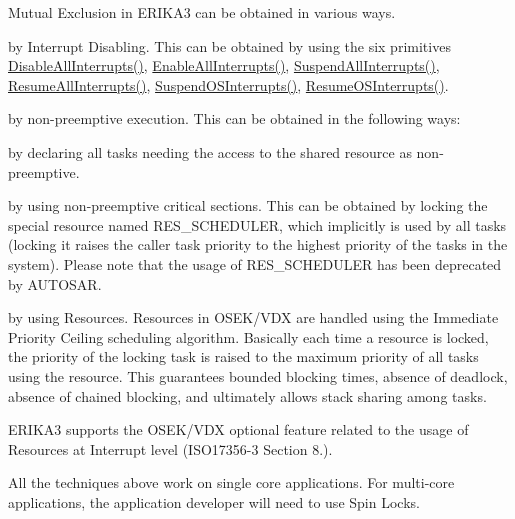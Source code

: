 Mutual Exclusion in E\+R\+I\+K\+A3 can be obtained in various ways.


\begin{DoxyItemize}
\item by Interrupt Disabling. This can be obtained by using the six primitives \mbox{\hyperlink{group__primitives-interrupt_ga071764bd533d349d7b74c1f0eba27e2d}{Disable\+All\+Interrupts()}}, \mbox{\hyperlink{group__primitives-interrupt_gae85134ff704512cc311c33c0b45cef5f}{Enable\+All\+Interrupts()}}, \mbox{\hyperlink{group__primitives-interrupt_ga2de84d7e2cb952f13a22752454283db5}{Suspend\+All\+Interrupts()}}, \mbox{\hyperlink{group__primitives-interrupt_ga5e78cef9a3dbbdbaa85bb2e228051c93}{Resume\+All\+Interrupts()}}, \mbox{\hyperlink{group__primitives-interrupt_ga04bd5d41274b9695cf55e0341092ba66}{Suspend\+O\+S\+Interrupts()}}, \mbox{\hyperlink{group__primitives-interrupt_ga7c49cf33445ba4b9efe4507f98ce7ae5}{Resume\+O\+S\+Interrupts()}}.
\item by non-\/preemptive execution. This can be obtained in the following ways\+:
\begin{DoxyItemize}
\item by declaring all tasks needing the access to the shared resource as non-\/preemptive.
\item by using non-\/preemptive critical sections. This can be obtained by locking the special resource named R\+E\+S\+\_\+\+S\+C\+H\+E\+D\+U\+L\+ER, which implicitly is used by all tasks (locking it raises the caller task priority to the highest priority of the tasks in the system). Please note that the usage of R\+E\+S\+\_\+\+S\+C\+H\+E\+D\+U\+L\+ER has been deprecated by A\+U\+T\+O\+S\+AR.
\end{DoxyItemize}
\item by using Resources. Resources in O\+S\+E\+K/\+V\+DX are handled using the Immediate Priority Ceiling scheduling algorithm. Basically each time a resource is locked, the priority of the locking task is raised to the maximum priority of all tasks using the resource. This guarantees bounded blocking times, absence of deadlock, absence of chained blocking, and ultimately allows stack sharing among tasks.
\end{DoxyItemize}

E\+R\+I\+K\+A3 supports the O\+S\+E\+K/\+V\+DX optional feature related to the usage of Resources at Interrupt level (I\+S\+O17356-\/3 Section 8.).

All the techniques above work on single core applications. For multi-\/core applications, the application developer will need to use Spin Locks. 